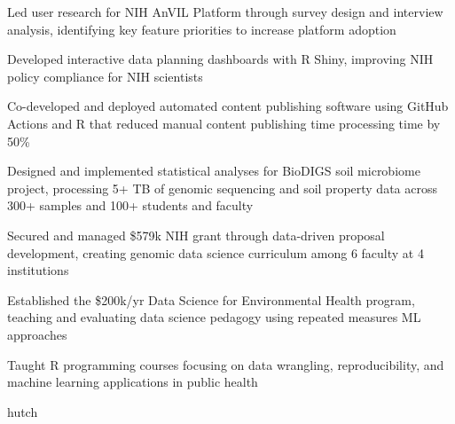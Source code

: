 \documentclass{ats_resume}
\newcommand{\itemspace}{\vspace{-2mm}}
\begin{document}
{{            \item Led user research for NIH AnVIL Platform through survey design and interview analysis, identifying key feature priorities to increase platform adoption
            \item Developed interactive data planning dashboards with R Shiny, improving NIH policy compliance for NIH scientists
            \item Co-developed and deployed automated content publishing software using GitHub Actions and R that reduced manual content publishing time processing time by 50\%
            \item Designed and implemented statistical analyses for BioDIGS soil microbiome project, processing 5+ TB of genomic sequencing and soil property data across 300+ samples and 100+ students and faculty
            \item Secured and managed \$579k NIH grant through data-driven proposal development, creating genomic data science curriculum among 6 faculty at 4 institutions
            \item Established the \$200k/yr Data Science for Environmental Health program, teaching and evaluating data science pedagogy using repeated measures ML approaches
            \item Taught R programming courses focusing on data wrangling, reproducibility, and machine learning applications in public health
       }{hutch} \\
       
       \itemspace

        \\
       
       \itemspace
       
}
\end{document}
